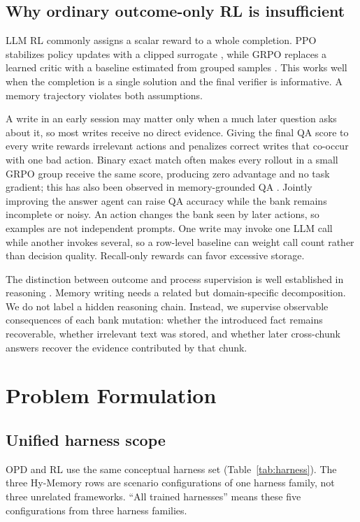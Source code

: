 \documentclass{article}
\begin{document}
\subsection{Why ordinary outcome-only RL is insufficient}

LLM RL commonly assigns a scalar reward to a whole completion. PPO stabilizes policy updates with a clipped surrogate \citep{ppo}, while GRPO replaces a learned critic with a baseline estimated from grouped samples \citep{grpo}. This works well when the completion is a single solution and the final verifier is informative. A memory trajectory violates both assumptions.

A write in an early session may matter only when a much later question asks about it, so most writes receive no direct evidence. Giving the final QA score to every write rewards irrelevant actions and penalizes correct writes that co-occur with one bad action. Binary exact match often makes every rollout in a small GRPO group receive the same score, producing zero advantage and no task gradient; this has also been observed in memory-grounded QA \citep{he2026}. Jointly improving the answer agent can raise QA accuracy while the bank remains incomplete or noisy. An action changes the bank seen by later actions, so examples are not independent prompts. One write may invoke one LLM call while another invokes several, so a row-level baseline can weight call count rather than decision quality. Recall-only rewards can favor excessive storage.

The distinction between outcome and process supervision is well established in reasoning \citep{lightman}. Memory writing needs a related but domain-specific decomposition. We do not label a hidden reasoning chain. Instead, we supervise observable consequences of each bank mutation: whether the introduced fact remains recoverable, whether irrelevant text was stored, and whether later cross-chunk answers recover the evidence contributed by that chunk.

\section{Problem Formulation}

\subsection{Unified harness scope}

OPD and RL use the same conceptual harness set (Table~\ref{tab:harness}). The three Hy-Memory rows are scenario configurations of one harness family, not three unrelated frameworks. ``All trained harnesses'' means these five configurations from three harness families.
\end{document}
